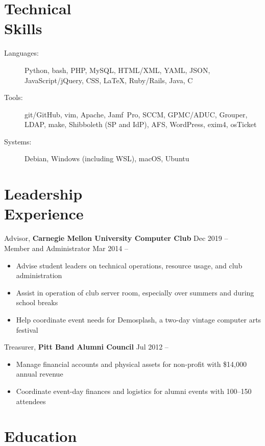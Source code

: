 \documentclass[11pt]{article}
\newcommand{\textdb}[1]{\fontseries{db}\selectfont#1\normalfont}
\newcommand{\present}{\phantom{Xxx 20XX}}
\newcommand{\itemizeonly}{\leavevmode\par\vspace{\dimexpr-\baselineskip-\parskip}}
\begin{document}
\section{Technical\\ Skills}

\itemizeonly
\begin{description}
	\item[\textdb{Languages:}] Python, bash, PHP, MySQL, HTML/XML, YAML, JSON,
		JavaScript/jQuery, CSS, \LaTeX, Ruby/Rails, Java, C
	\item[\textdb{Tools:}] git/GitHub, vim, Apache,
		Jamf~Pro, SCCM, GPMC/ADUC, Grouper, LDAP, make,
		Shibboleth (SP and IdP), AFS, WordPress, exim4, osTicket
	\item[\textdb{Systems:}] Debian, Windows (including WSL), macOS, Ubuntu
\end{description}



\section{Leadership\\ Experience}

\textdb{
Advisor,
\textbf{Carnegie Mellon University Computer Club}
	\hfill Dec 2019 -- \present \\
}
\textdb{
Member and Administrator
	\hfill Mar 2014 -- \present
}
\begin{itemize}
	\item Advise student leaders on technical operations,
		resource usage, and club administration
	\item Assist in operation of club server room,
		especially over summers and during school breaks
	\item Help coordinate event needs for Demosplash,
		a two-day vintage computer arts festival
\end{itemize}

\textdb{
Treasurer,
\textbf{Pitt Band Alumni Council}
	\hfill Jul 2012 -- \present
}
\begin{itemize}
	\item Manage financial accounts and physical assets
		for non-profit with \$14,000 annual revenue
	\item Coordinate event-day finances and logistics for alumni events with 100--150 attendees
\end{itemize}



\section{Education}
\end{document}
